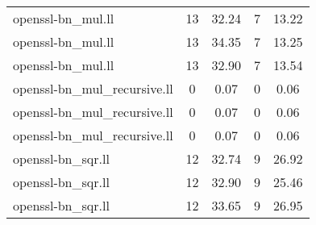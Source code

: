\begin{tabular}{l|c|c|c|c|}
openssl-bn\_mul.ll & 13 & 32.24 & 7 & 13.22\\
openssl-bn\_mul.ll & 13 & 34.35 & 7 & 13.25\\
openssl-bn\_mul.ll & 13 & 32.90 & 7 & 13.54\\
openssl-bn\_mul\_recursive.ll & 0 & 0.07 & 0 & 0.06\\
openssl-bn\_mul\_recursive.ll & 0 & 0.07 & 0 & 0.06\\
openssl-bn\_mul\_recursive.ll & 0 & 0.07 & 0 & 0.06\\
openssl-bn\_sqr.ll & 12 & 32.74 & 9 & 26.92\\
openssl-bn\_sqr.ll & 12 & 32.90 & 9 & 25.46\\
openssl-bn\_sqr.ll & 12 & 33.65 & 9 & 26.95\\
\bottomrule
\end{tabular}
